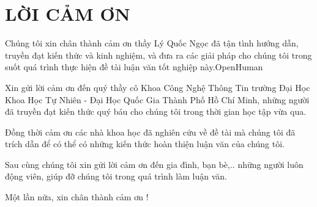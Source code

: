 \vspace{2cm}
	
{}
{
\section*{\centering \MakeUppercase{LỜI CẢM ƠN}}
}

\vspace{2cm}
{

Chúng tôi xin chân thành cảm ơn thầy Lý Quốc Ngọc đã tận tình hướng dẫn, truyền đạt kiến thức và kinh nghiệm, và đưa ra các giải pháp cho chúng tôi trong suốt quá trình thực hiện đề tài luận văn tốt nghiệp này.OpenHuman

Xin gửi lời cảm ơn đến quý thầy cô Khoa Công Nghệ Thông Tin trường Đại Học Khoa Học Tự Nhiên - Đại Học Quốc Gia Thành Phố Hồ Chí Minh, những người đã truyền đạt kiến thức quý báu cho chúng tôi trong thời gian học tập vừa qua.

Đồng thời cảm ơn các nhà khoa học đã nghiên cứu về đề tài mà chúng tôi đã trích dẫn để có thể có những kiến thức hoàn thiện luận văn của chúng tôi.

Sau cùng chúng tôi xin gửi lời cảm ơn đến gia đình, bạn bè,.. những người luôn động viên, giúp đỡ chúng tôi trong quá trình làm luận văn. 

Một lần nữa, xin chân thành cảm ơn !
}

\pagebreak
